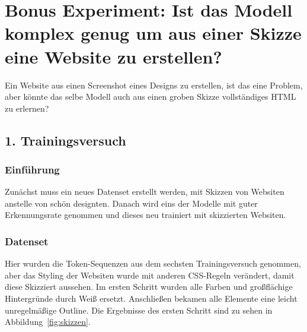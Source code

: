 \documentclass[pdftex,a4paper,halfparskip, article]{scrartcl}
\begin{document}
\section{Bonus Experiment: Ist das Modell komplex genug um aus einer Skizze eine Website zu erstellen?}

Ein Website aus einen Screenshot eines Designs zu erstellen, ist das eine Problem, aber könnte das selbe Modell auch aus einen groben Skizze vollständiges HTML zu erlernen?

\subsection{1. Trainingsversuch}

\subsubsection*{Einführung}

Zunächst muss ein neues Datenset erstellt werden, mit Skizzen von Websiten anstelle von schön designten. Danach wird eins der Modelle mit guter Erkennungsrate genommen und dieses neu trainiert mit skizzierten Websiten.

\subsubsection*{Datenset}

Hier wurden die Token-Sequenzen aus dem sechsten Trainingsversuch genommen, aber das Styling der Websiten wurde mit anderen CSS-Regeln verändert, damit diese Skizziert aussehen. Im ersten Schritt wurden alle Farben und großflächige Hintergründe durch Weiß ersetzt. Anschließen bekamen alle Elemente eine leicht unregelmäßige Outline. Die Ergebnisse des ersten Schritt sind zu sehen in Abbildung~\ref{fig:skizzen}.
\end{document}
